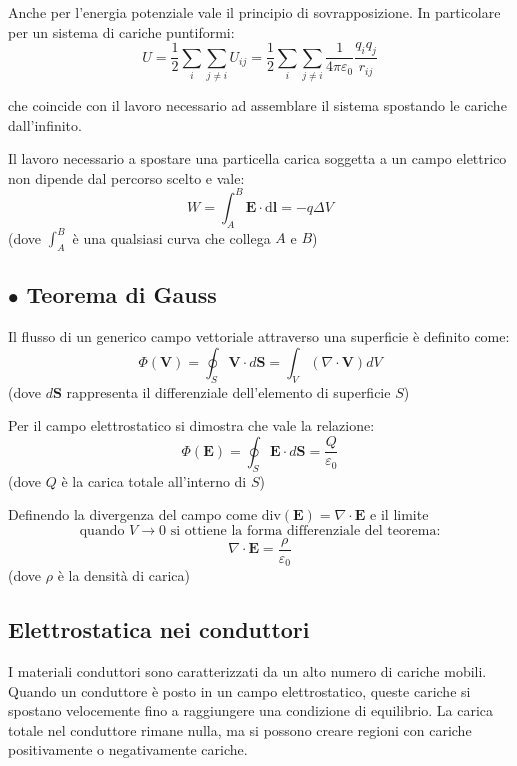 \documentclass{article}
\begin{document}
Anche per l'energia potenziale vale il principio di sovrapposizione. In particolare per un sistema di cariche puntiformi:
\[
U = \frac{1}{2} \sum_{i} \sum_{j \neq i} U_{ij} = \frac{1}{2} \sum_{i} \sum_{j \neq i} \frac{1}{4\pi\varepsilon_0} \frac{q_i q_j}{r_{ij}}
\]

che coincide con il lavoro necessario ad assemblare il sistema spostando le cariche dall'infinito.

Il lavoro necessario a spostare una particella carica soggetta a un campo elettrico non dipende dal percorso scelto e vale:
\[
W = \int_{A}^{B} \mathbf{E} \cdot \mathrm{d}\mathbf{l} = -q \Delta V
\]
(dove \( \int_{A}^{B} \) è una qualsiasi curva che collega \( A \) e \( B \))



\subsection*{$\bullet$ Teorema di Gauss}

Il flusso di un generico campo vettoriale attraverso una superficie è definito come:
\[
\Phi(\mathbf{V}) = \oint_S \mathbf{V} \cdot d\mathbf{S} = \int_V (\nabla \cdot \mathbf{V}) dV
\]
(dove \( d\mathbf{S} \) rappresenta il differenziale dell'elemento di superficie \( S \))

Per il campo elettrostatico si dimostra che vale la relazione:
\[
\Phi(\mathbf{E}) = \oint_S \mathbf{E} \cdot d\mathbf{S} = \frac{Q}{\varepsilon_0}
\]
(dove \( Q \) è la carica totale all'interno di \( S \))

Definendo la divergenza del campo come \( \text{div}(\mathbf{E}) = \nabla \cdot \mathbf{E} \) e il limite
\[
\text{quando } V \to 0 \text{ si ottiene la forma differenziale del teorema:}
\]
\[
\nabla \cdot \mathbf{E} = \frac{\rho}{\varepsilon_0}
\]
(dove \( \rho \) è la densità di carica)



\subsection*{Elettrostatica nei conduttori}

I materiali conduttori sono caratterizzati da un alto numero di cariche mobili. Quando un conduttore è posto in un campo elettrostatico, queste cariche si spostano velocemente fino a raggiungere una condizione di equilibrio. La carica totale nel conduttore rimane nulla, ma si possono creare regioni con cariche positivamente o negativamente cariche.
\end{document}
